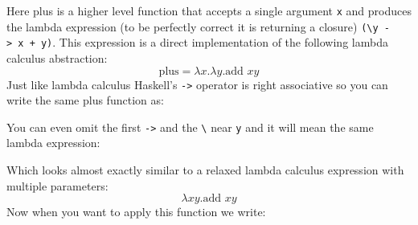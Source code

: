 \begin{Shaded}
\begin{Highlighting}[]
\OtherTok{=}\OtherTok{{-}\textgreater{}}\OtherTok{{-}\textgreater{}}\OperatorTok{+}
\end{Highlighting}
\end{Shaded}

Here plus is a higher level function that accepts a single argument
\texttt{x} and produces the lambda expression (to be perfectly correct
it is returning a closure)
\texttt{(\textbackslash{}y\ -\textgreater{}\ x\ +\ y)}. This expression
is a direct implementation of the following lambda calculus abstraction:
\[
\text{plus}=\lambda x.\lambda y. \text{add }x y
\] Just like lambda calculus Haskell's \texttt{-\textgreater{}} operator
is right associative so you can write the same plus function as:

\begin{Shaded}
\begin{Highlighting}[]
\OtherTok{=}\OtherTok{{-}\textgreater{}}\OtherTok{{-}\textgreater{}}\OperatorTok{+}
\end{Highlighting}
\end{Shaded}

You can even omit the first \texttt{-\textgreater{}} and the
\texttt{\textbackslash{}} near \texttt{y} and it will mean the same
lambda expression:

\begin{Shaded}
\begin{Highlighting}[]
\OtherTok{=}\OtherTok{{-}\textgreater{}}\OperatorTok{+}
\end{Highlighting}
\end{Shaded}

Which looks almost exactly similar to a relaxed lambda calculus
expression with multiple parameters: \[
\lambda xy.\text{add }xy
\] Now when you want to apply this function we write:

\begin{Shaded}
\begin{Highlighting}[]
\OperatorTok{\textgreater{}}\NormalTok{) }
\end{Highlighting}
\end{Shaded}

